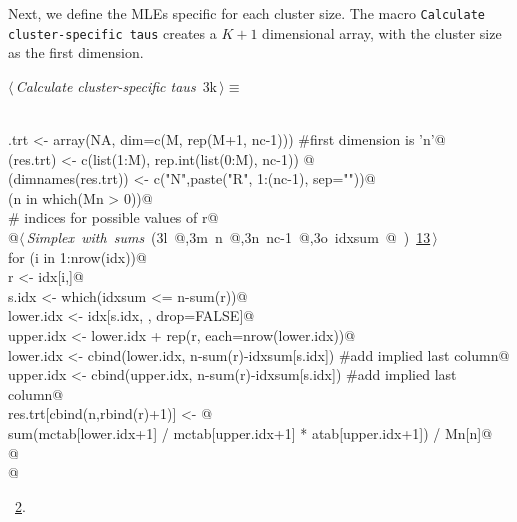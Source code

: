 \documentclass[reqno]{amsart}
\renewcommand{\NWtarget}[2]{\hypertarget{#1}{#2}}
\renewcommand{\NWlink}[2]{\hyperlink{#1}{#2}}
\begin{document}
Next, we define the MLEs specific for each cluster size. The macro \texttt{Calculate cluster-specific taus}
creates a $K+1$ dimensional array, with the cluster size as the first dimension.

\begin{flushleft} \small\label{scrap13}\raggedright\small
\NWtarget{nuweb3k}{} $\langle\,${\itshape Calculate cluster-specific taus}\nobreak\ {\footnotesize {3k}}$\,\rangle\equiv$
\vspace{-1ex}
\begin{list}{}{} \item
\mbox{}\verb@@\\
\mbox{}\verb@res.trt <- array(NA, dim=c(M, rep(M+1, nc-1))) #first dimension is 'n'@\\
\mbox{}\verb@dimnames(res.trt) <- c(list(1:M), rep.int(list(0:M), nc-1)) @\\
\mbox{}\verb@names(dimnames(res.trt)) <- c("N",paste("R", 1:(nc-1), sep=""))@\\
\mbox{}\verb@for (n in which(Mn > 0)){@\\
\mbox{}\verb@  # indices for possible values of r@\\
\mbox{}\verb@  @\hbox{$\langle\,${\itshape Simplex with sums}\nobreak\ ({\footnotesize 3l\label{scrap14}
 }\mbox{}\verb@idx @,{\footnotesize 3m\label{scrap15}
 }\mbox{}\verb@ n @,{\footnotesize 3n\label{scrap16}
 }\mbox{}\verb@ nc-1 @,{\footnotesize 3o\label{scrap17}
 }\mbox{}\verb@ idxsum @ ) {\footnotesize \NWlink{nuweb13}{13}}$\,\rangle$}\verb@@\\
\mbox{}\verb@  for (i in 1:nrow(idx)){@\\
\mbox{}\verb@    r <- idx[i,]@\\
\mbox{}\verb@    s.idx <- which(idxsum <= n-sum(r))@\\
\mbox{}\verb@    lower.idx <- idx[s.idx, , drop=FALSE]@\\
\mbox{}\verb@    upper.idx <- lower.idx + rep(r, each=nrow(lower.idx))@\\
\mbox{}\verb@    lower.idx <- cbind(lower.idx, n-sum(r)-idxsum[s.idx])   #add implied last column@\\
\mbox{}\verb@    upper.idx <- cbind(upper.idx, n-sum(r)-idxsum[s.idx])   #add implied last column@\\
\mbox{}\verb@    res.trt[cbind(n,rbind(r)+1)] <- @\\
\mbox{}\verb@      sum(mctab[lower.idx+1] / mctab[upper.idx+1] * atab[upper.idx+1]) / Mn[n]@\\
\mbox{}\verb@  }@\\
\mbox{}\verb@}@\\
\mbox{}\verb@@{\NWsep}
\end{list}
\vspace{-1.5ex}
\footnotesize
\begin{list}{}{\setlength{\itemsep}{-\parsep}\setlength{\itemindent}{-\leftmargin}}
\item \NWtxtMacroRefIn\ \NWlink{nuweb2}{2}.

\item{}
\end{list}
\vspace{4ex}
\end{flushleft}
\end{document}

